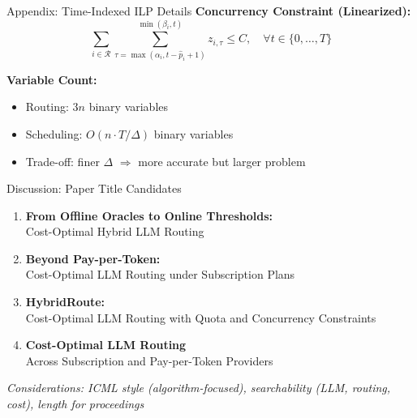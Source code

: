 \documentclass[aspectratio=169,10pt]{beamer}
\begin{document}
\begin{frame}[noframenumbering]{Appendix: Time-Indexed ILP Details}
\textbf{Concurrency Constraint (Linearized):}
\begin{equation*}
\sum_{i \in \mathcal{R}} \sum_{\tau=\max(\alpha_i, t-\hat{p}_i+1)}^{\min(\beta_i, t)} z_{i,\tau} \leq C, \quad \forall t \in \{0, \ldots, T\}
\end{equation*}

\vspace{0.3cm}
\textbf{Variable Count:}
\begin{itemize}
    \item Routing: $3n$ binary variables
    \item Scheduling: $O(n \cdot T / \Delta)$ binary variables
    \item Trade-off: finer $\Delta$ $\Rightarrow$ more accurate but larger problem
\end{itemize}
\end{frame}

\begin{frame}[noframenumbering]{Discussion: Paper Title Candidates}
\begin{enumerate}
    \item \textbf{From Offline Oracles to Online Thresholds:} \\
    Cost-Optimal Hybrid LLM Routing

    \vspace{0.3cm}
    \item \textbf{Beyond Pay-per-Token:} \\
    Cost-Optimal LLM Routing under Subscription Plans

    \vspace{0.3cm}
    \item \textbf{\textcolor{icmlblue}{HybridRoute}:} \\
    Cost-Optimal LLM Routing with Quota and Concurrency Constraints

    \vspace{0.3cm}
    \item \textbf{Cost-Optimal LLM Routing} \\
    Across Subscription and Pay-per-Token Providers
\end{enumerate}

\vspace{0.4cm}
\small
\textit{Considerations: ICML style (algorithm-focused), searchability (LLM, routing, cost), length for proceedings}
\end{frame}
\end{document}
